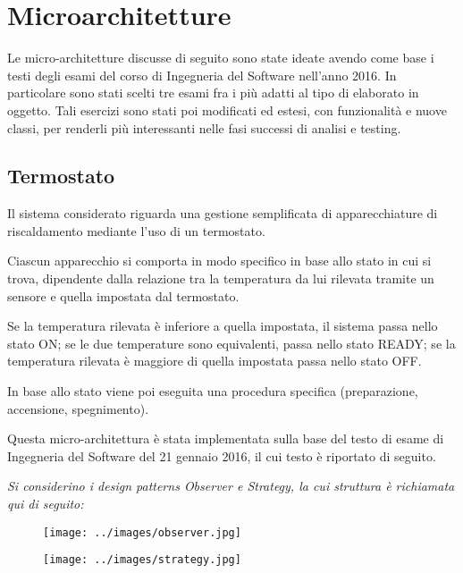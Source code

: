 \chapter{Microarchitetture}

Le micro-architetture discusse di seguito sono state ideate avendo come base i testi degli esami del corso di Ingegneria del Software nell'anno 2016. In particolare sono stati scelti tre esami fra i più adatti al tipo di elaborato in oggetto.
Tali esercizi sono stati poi modificati ed estesi, con funzionalità e nuove classi, per renderli più interessanti nelle fasi successi di analisi e testing.

\section{Termostato}

Il sistema considerato riguarda una gestione semplificata di apparecchiature di riscaldamento mediante l’uso di un termostato. 

Ciascun apparecchio si comporta in modo specifico in base allo stato in cui si trova, dipendente dalla relazione tra la temperatura da lui rilevata tramite un sensore e quella impostata dal termostato. 

Se la temperatura rilevata è inferiore a quella impostata, il sistema passa nello stato ON; se le due temperature sono equivalenti, passa nello stato READY; se la temperatura rilevata è maggiore di quella impostata passa nello stato OFF. 

In base allo stato viene poi eseguita una procedura specifica (preparazione, accensione, spegnimento).

Questa micro-architettura è stata implementata sulla base del testo di esame di Ingegneria del Software del 21 gennaio 2016, il cui testo è riportato di seguito.

\vspace{0.5cm}

\emph{Si considerino i design patterns Observer e Strategy, la cui struttura è richiamata qui di seguito:
}
\begin{figure}[h]
    \texttt{[image: ../images/observer.jpg]}
\end{figure}

\begin{figure}[h]
    \texttt{[image: ../images/strategy.jpg]}
\end{figure}

